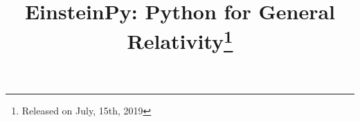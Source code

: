 \documentclass{aastex63}
\begin{document}
\title{EinsteinPy: Python for General Relativity\footnote{Released on July, 15th, 2019}}



\end{document}
